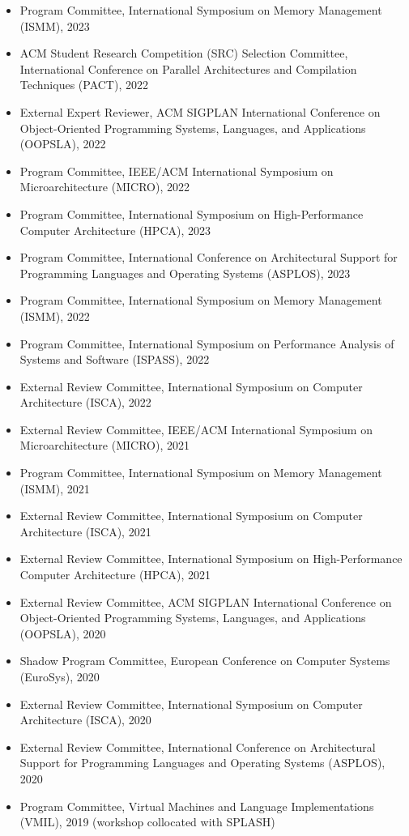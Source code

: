 \documentclass[singlecolumn,singlespace,11pt]{article}
\begin{document}
\begin{itemize}
\item Program Committee, International Symposium on Memory Management (ISMM), 2023
\item ACM Student Research Competition (SRC) Selection Committee, International Conference on Parallel Architectures and Compilation Techniques (PACT), 2022
\item External Expert Reviewer, ACM SIGPLAN International Conference on Object-Oriented Programming Systems, Languages, and Applications (OOPSLA), 2022
\item Program Committee, IEEE/ACM International Symposium on Microarchitecture (MICRO), 2022
\item Program Committee, International Symposium on High-Performance Computer Architecture (HPCA), 2023
\item Program Committee, International Conference on Architectural Support for Programming Languages and Operating Systems (ASPLOS), 2023
\item Program Committee, International Symposium on Memory Management (ISMM), 2022
\item Program Committee, International Symposium on Performance Analysis of Systems and Software (ISPASS), 2022
\item External Review Committee, International Symposium on Computer Architecture (ISCA), 2022
\item External Review Committee, IEEE/ACM International Symposium on Microarchitecture (MICRO), 2021
\item Program Committee, International Symposium on Memory Management (ISMM), 2021
\item External Review Committee, International Symposium on Computer Architecture (ISCA), 2021
\item External Review Committee, International Symposium on High-Performance Computer Architecture (HPCA), 2021
\item External Review Committee, ACM SIGPLAN International Conference on Object-Oriented Programming Systems, Languages, and Applications (OOPSLA), 2020
\item Shadow Program Committee, European Conference on Computer Systems (EuroSys), 2020
\item External Review Committee, International Symposium on Computer Architecture (ISCA), 2020
\item External Review Committee, International Conference on Architectural Support for Programming Languages and Operating Systems (ASPLOS), 2020
\item Program Committee, Virtual Machines and Language Implementations (VMIL), 2019 (workshop collocated with SPLASH)

\end{itemize}
\end{document}
